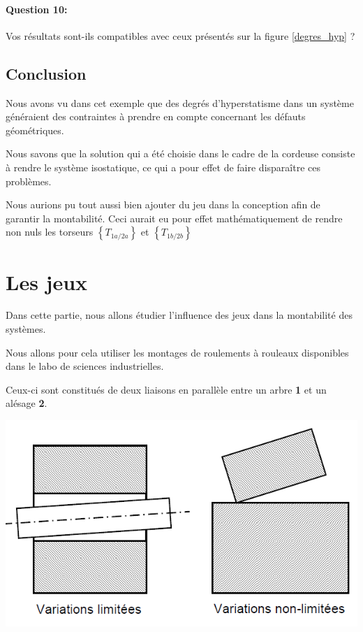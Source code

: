 \paragraph{Question 10:} Vos résultats sont-ils compatibles avec ceux présentés sur la figure \ref{degres_hyp} ?

\reponse[2]

\subsection{Conclusion}

Nous avons vu dans cet exemple que des degrés d'hyperstatisme dans un système généraient des contraintes à prendre en compte concernant les défauts géométriques.

Nous savons que la solution qui a été choisie dans le cadre de la cordeuse consiste à rendre le système isostatique, ce qui a pour effet de faire disparaître ces problèmes.

Nous aurions pu tout aussi bien ajouter du jeu dans la conception afin de garantir la montabilité. Ceci aurait eu pour effet mathématiquement de rendre non nuls les torseurs $\left\{T_{1a/2a}\right\}$ et $\left\{T_{1b/2b}\right\}$

\newpage

\section{Les jeux}

\begin{minipage}{0.48\linewidth}
Dans cette partie, nous allons étudier l'influence des jeux dans la montabilité des systèmes.

Nous allons pour cela utiliser les montages de roulements à rouleaux disponibles dans le labo de sciences industrielles.

Ceux-ci sont constitués de deux liaisons en parallèle entre un arbre \textbf{1} et un alésage \textbf{2}.
\end{minipage}
\hfill
\begin{minipage}{0.45\linewidth}
 \includegraphics[width=0.8\linewidth]{img/Fig3.png}
\end{minipage}

